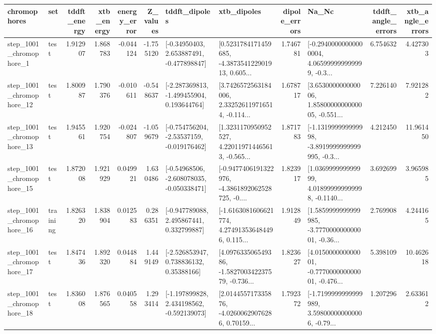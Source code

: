 \begin{tabular}{llrrrrllrlrr}
\toprule
             chromophores &       set &  tddft\_energy &  xtb\_energy &  energy\_error &  Z\_values &                               tddft\_dipoles &                                        xtb\_dipoles &  dipole\_errors &                                              Na\_Nc &  tddft\_angle\_errors &  xtb\_angle\_errors \\
\midrule
  step\_1001\_chromophore\_1 &      test &      1.912907 &    1.868783 &     -0.044124 & -1.755120 &    [-0.34950403, 2.653887491, -0.477898847] &  [0.5231784171459685, -4.387354122901913, 0.605... &       1.746781 &  [-0.29400000000000004, 4.065999999999999, -0.3... &            6.754632 &          4.427303 \\
 step\_1001\_chromophore\_12 &      test &      1.800987 &    1.790376 &     -0.010611 & -0.548637 &   [-2.287369813, -1.499455904, 0.193644764] &  [3.7426572563184006, 2.332526119716514, -0.114... &       1.678717 &  [3.653000000000006, 1.8580000000000005, -0.551... &            7.226140 &          7.921282 \\
 step\_1001\_chromophore\_13 &      test &      1.945561 &    1.920754 &     -0.024807 & -1.059679 &   [-0.754756204, -2.53537159, -0.019176462] &  [1.3231170950952527, 4.220119714465613, -0.565... &       1.871783 &  [-1.131999999999998, -3.8919999999999995, -0.3... &            4.212450 &         11.961450 \\
 step\_1001\_chromophore\_15 &      test &      1.872008 &    1.921929 &      0.049921 &  1.630486 &   [-0.54968506, -2.608078035, -0.050338471] &  [-0.9477406191322976, -4.3861892062528725, -0.... &       1.823917 &  [1.036999999999999, 4.018999999999998, -0.1140... &            3.692699 &          3.965985 \\
 step\_1001\_chromophore\_16 &  training &      1.826320 &    1.838904 &      0.012583 &  0.286351 &    [-0.947789088, 2.495867441, 0.332799887] &  [-1.6163081606621774, 4.274913536484496, 0.115... &       1.912849 &  [1.5859999999999985, -3.777000000000001, -0.36... &            2.769908 &          4.244165 \\
 step\_1001\_chromophore\_17 &      test &      1.847436 &    1.892320 &      0.044884 &  1.449149 &     [-2.526853947, 0.738836132, 0.35388166] &  [4.097633506549386, -1.582700342237579, -0.736... &       1.823627 &  [4.015000000000001, -0.777000000000001, -0.476... &            5.398109 &         10.462618 \\
 step\_1001\_chromophore\_18 &      test &      1.836008 &    1.876565 &      0.040558 &  1.293414 &   [-1.197899828, 2.434198562, -0.592139073] &  [2.014455717335876, -4.02600629076286, 0.70159... &       1.792372 &  [-1.7199999999999989, 3.598000000000006, -0.79... &            1.207296 &          2.633612 \\

\end{tabular}
